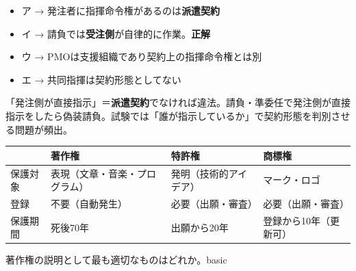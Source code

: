 \begin{goutoubun}
\begin{itemize}
  \item ア → 発注者に指揮命令権があるのは\textbf{派遣契約}
  \item イ → 請負では\textbf{受注側}が自律的に作業。\textbf{正解}
  \item ウ → PMOは支援組織であり契約上の指揮命令権とは別
  \item エ → 共同指揮は契約形態としてない
\end{itemize}
\end{goutoubun}

\begin{kaisetsu}
「発注側が直接指示」＝\textbf{派遣契約}でなければ違法。請負・準委任で発注側が直接指示をしたら偽装請負。試験では「誰が指示しているか」で契約形態を判別させる問題が頻出。
\end{kaisetsu}


\mondaipage
{}

\begin{center}
\begin{tabularx}{\textwidth}{lXXX}
  \toprule
  & \textbf{著作権} & \textbf{特許権} & \textbf{商標権} \\
  \midrule
  保護対象 & 表現（文章・音楽・プログラム） & 発明（技術的アイデア） & マーク・ロゴ \\
  登録 & 不要（自動発生） & 必要（出願・審査） & 必要（出願・審査） \\
  保護期間 & 死後70年 & 出願から20年 & 登録から10年（更新可） \\
  \bottomrule
\end{tabularx}
\end{center}


\begin{mondai}{著作権の説明として最も適切なものはどれか。}{basic}
\end{mondai}

